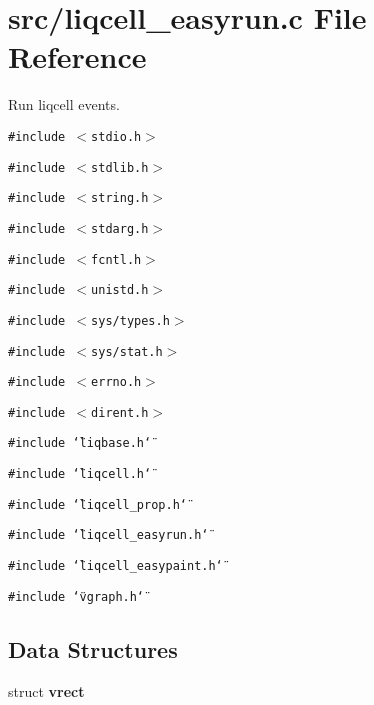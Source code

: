 \section{src/liqcell\_\-easyrun.c File Reference}
\label{d5/d54/liqcell__easyrun_8c}
Run liqcell events.  


{\tt \#include $<$stdio.h$>$}\par
{\tt \#include $<$stdlib.h$>$}\par
{\tt \#include $<$string.h$>$}\par
{\tt \#include $<$stdarg.h$>$}\par
{\tt \#include $<$fcntl.h$>$}\par
{\tt \#include $<$unistd.h$>$}\par
{\tt \#include $<$sys/types.h$>$}\par
{\tt \#include $<$sys/stat.h$>$}\par
{\tt \#include $<$errno.h$>$}\par
{\tt \#include $<$dirent.h$>$}\par
{\tt \#include \char`\"{}liqbase.h\char`\"{}}\par
{\tt \#include \char`\"{}liqcell.h\char`\"{}}\par
{\tt \#include \char`\"{}liqcell\_\-prop.h\char`\"{}}\par
{\tt \#include \char`\"{}liqcell\_\-easyrun.h\char`\"{}}\par
{\tt \#include \char`\"{}liqcell\_\-easypaint.h\char`\"{}}\par
{\tt \#include \char`\"{}vgraph.h\char`\"{}}\par
\subsection*{Data Structures}
\begin{CompactItemize}
\item 
struct \textbf{vrect}
\end{CompactItemize}
